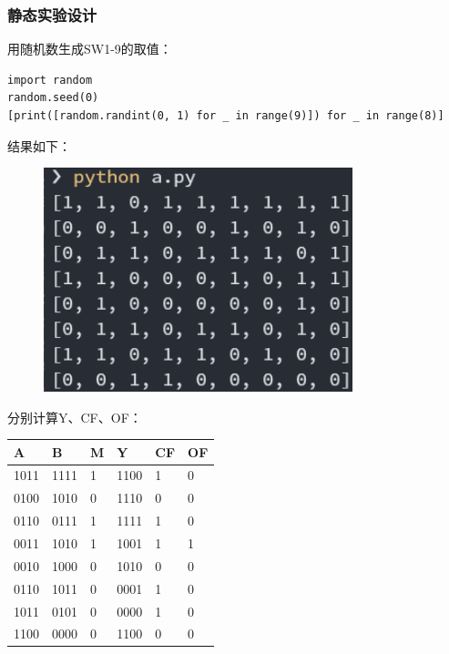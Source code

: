 \documentclass[UTF8, a4paper, 11pt]{article}
\begin{document}
\subsubsection{静态实验设计}
用随机数生成SW1-9的取值：
\begin{lstlisting}
import random
random.seed(0)
[print([random.randint(0, 1) for _ in range(9)]) for _ in range(8)]
\end{lstlisting}
结果如下：
\begin{figure}[H]
    \centering
    \includegraphics[width=0.8\textwidth]{rand.png}
\end{figure}
分别计算Y、CF、OF：
\begin{table}[H]
    \centering
\begin{tabular}{|l|l|l|l|l|l|}
\hline
A    & B    & M & Y    & CF & OF \\ \hline
1011 & 1111 & 1 & 1100 & 1  & 0  \\ \hline
0100 & 1010 & 0 & 1110 & 0  & 0  \\ \hline
0110 & 0111 & 1 & 1111 & 1  & 0  \\ \hline
0011 & 1010 & 1 & 1001 & 1  & 1  \\ \hline
0010 & 1000 & 0 & 1010 & 0  & 0  \\ \hline
0110 & 1011 & 0 & 0001 & 1  & 0  \\ \hline
1011 & 0101 & 0 & 0000 & 1  & 0  \\ \hline
1100 & 0000 & 0 & 1100 & 0  & 0  \\ \hline
\end{tabular}
\end{table}
\end{document}
